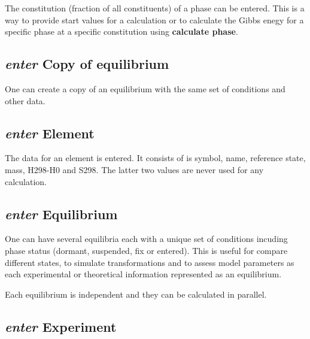 \documentclass[12pt]{article}
\begin{document}
The constitution (fraction of all constituents) of a phase can be
entered.  This is a way to provide start values for a calculation or
to calculate the Gibbs enegy for a specific phase at a specific
constitution using {\bf calculate phase}.

\subsection{{\em enter} Copy of equilibrium}

One can create a copy of an equilibrium with the same set of
conditions and other data.

\subsection{{\em enter} Element}

The data for an element is entered.  It consists of is symbol, name,
reference state, mass, H298-H0 and S298.  The latter two values are 
never used for any calculation.

\subsection{{\em enter} Equilibrium}

One can have several equilibria each with a unique set of conditions
incuding phase status (dormant, suspended, fix or entered).  This is
useful for compare different states, to simulate transformations and
to assess model parameters as each experimental or theoretical
information represented as an equilibrium.  

Each equilibrium is independent and they can be calculated in
parallel.

\subsection{{\em enter} Experiment}
\end{document}
